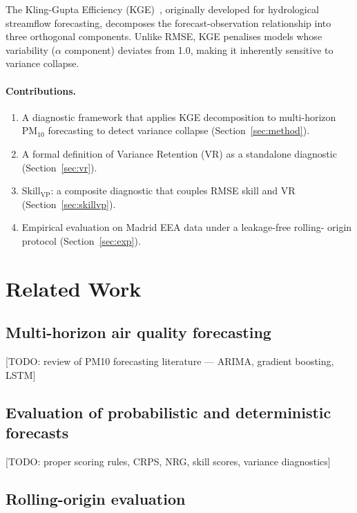 \documentclass[11pt,a4paper]{article}
\begin{document}
The Kling-Gupta Efficiency (KGE)~\citep{gupta2009}, originally developed for
hydrological streamflow forecasting, decomposes the forecast-observation
relationship into three orthogonal components.
Unlike RMSE, KGE penalises models whose variability ($\alpha$ component)
deviates from 1.0, making it inherently sensitive to variance collapse.

\paragraph{Contributions.}
\begin{enumerate}
  \item A diagnostic framework that applies KGE decomposition to multi-horizon
        PM$_{10}$ forecasting to detect variance collapse (Section~\ref{sec:method}).
  \item A formal definition of Variance Retention (VR) as a standalone
        diagnostic (Section~\ref{sec:vr}).
  \item Skill$_{\mathrm{VP}}$: a composite diagnostic that couples RMSE skill
        and VR (Section~\ref{sec:skillvp}).
  \item Empirical evaluation on Madrid EEA data under a leakage-free rolling-
        origin protocol (Section~\ref{sec:exp}).
\end{enumerate}

\section{Related Work}\label{sec:related}

\subsection{Multi-horizon air quality forecasting}

[TODO: review of PM10 forecasting literature — ARIMA, gradient boosting, LSTM]

\subsection{Evaluation of probabilistic and deterministic forecasts}

[TODO: proper scoring rules, CRPS, NRG, skill scores, variance diagnostics]

\subsection{Rolling-origin evaluation}
\end{document}

